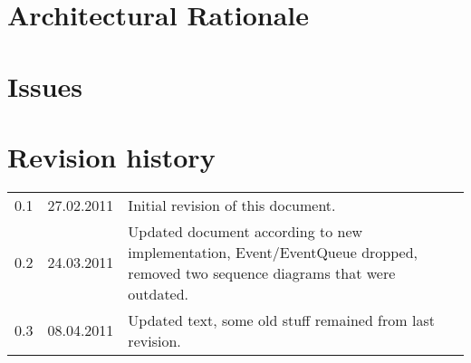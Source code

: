 \documentclass[titlepage,a4paper,11pt]{article}
\begin{document}
\section{Architectural Rationale}


\section{Issues}

\printbibliography

\section{Revision history}

\begin{table}[H]
  \begin{tabular}{| c | c | p{5cm} |}
    \hline
    0.1 & 27.02.2011 & Initial revision of this document. \\
	0.2 & 24.03.2011 & Updated document according to new implementation,
						Event/EventQueue dropped, removed two sequence diagrams that were outdated.\\
	0.3 & 08.04.2011 & Updated text, some old stuff remained from last revision. \\				
    \hline
  \end{tabular}
\end{table}
\end{document}
